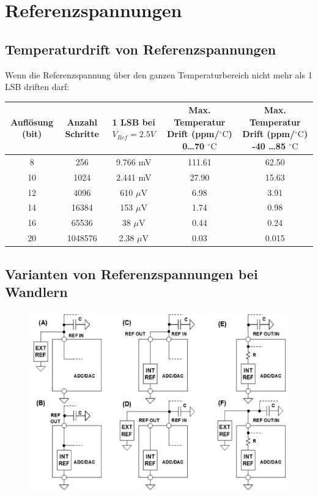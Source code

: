 \section{Referenzspannungen} 

\subsection{Temperaturdrift von Referenzspannungen}
Wenn die Referenzspannung über den ganzen Temperaturbereich nicht mehr als 1 LSB driften darf:

\begin{tabular}{|c|c|c|c|c|}
	\hline
	Auflösung (bit)	& 
	Anzahl Schritte	& 
	1 LSB bei $V_{Ref} = 2.5 V$	& 
	\multicolumn{1}{p{4cm}|}{Max. Temperatur Drift (ppm/$^{\circ} \mathrm{C}$) 0\ldots70 $^{\circ} \mathrm{C}$} &
	\multicolumn{1}{p{4cm}|}{Max. Temperatur Drift (ppm/$^{\circ} \mathrm{C}$) -40 \ldots 85 $^{\circ} \mathrm{C}$}
	\\ \hline
	8 	& 256	& 9.766 mV 		& 111.61	& 62.50
	\\ \hline
	10	& 1024	& 2.441 mV		& 27.90		& 15.63
	\\ \hline 
	12	& 4096	& 610 $\mu$V	& 6.98		& 3.91
	\\ \hline
	14	& 16384	& 153 $\mu$V	& 1.74		& 0.98
	\\ \hline
	16	& 65536	& 38 $\mu$V		& 0.44		& 0.24
	\\ \hline
	20	& 1048576	& 2.38 $\mu$V	& 0.03	& 0.015
	\\ \hline 
\end{tabular}


\subsection{Varianten von Referenzspannungen bei Wandlern}
\begin{figure}[!h]
\includegraphics[scale=0.3]{images/variantenReferenzspannungen}
\end{figure}


